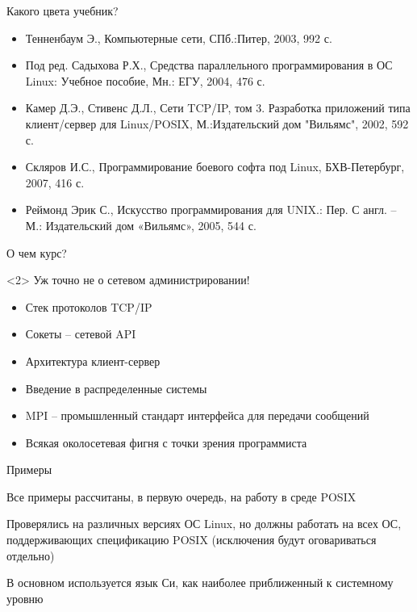 \documentclass[ignorenonframetext, hyperref={pdftex, unicode}]{beamer}
\begin{document}
\begin{frame}{Какого цвета учебник?}
	\begin{itemize}
		\item Тенненбаум Э.,  Компьютерные сети,  СПб.:Питер,  2003,  992 с.
		\item Под ред. Садыхова Р.Х.,  Средства параллельного программирования в ОС Linux: Учебное пособие,  Мн.: ЕГУ,  2004,  476 с.
		\item Камер Д.Э.,  Стивенс Д.Л.,  Сети TCP/IP,  том 3. Разработка приложений типа клиент/сервер для Linux/POSIX,  М.:Издательский дом "Вильямс",  2002,  592 с.
		\item Скляров И.С.,  Программирование боевого софта под Linux,  БХВ-Петербург,  2007,  416 с.
		\item Реймонд Эрик С.,  Искусство программирования для UNIX.: Пер. С англ. – М.: Издательский дом «Вильямс»,  2005,  544 с.
	\end{itemize}
\end{frame}



\begin{frame}{О чем курс?}
	\pause
	\begin{block}{}<2>
Уж точно не о сетевом администрировании!
	\end{block}
	\pause
	\begin{itemize}
		\item Стек протоколов TCP/IP
			\pause
		\item Сокеты -- сетевой API
			\pause
		\item Архитектура клиент-сервер
			\pause
		\item Введение в распределенные системы
			\pause
		\item MPI -- промышленный стандарт интерфейса для передачи сообщений
			\pause
		\item Всякая околосетевая фигня с точки зрения программиста
	\end{itemize}
\end{frame}

\begin{frame}{Примеры}
\begin{center}
	Все примеры рассчитаны, в первую очередь, на работу в среде POSIX
\par
	Проверялись на различных версиях ОС Linux, но должны работать на всех ОС, поддерживающих спецификацию POSIX (исключения будут оговариваться отдельно)
\par	
	В основном используется язык Си, как наиболее приближенный к системному уровню
\end{center}
\end{frame}
\end{document}
